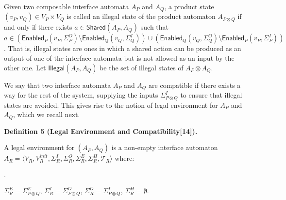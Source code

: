\documentclass[10pt,a4paper]{article}
\begin{document}
 
 
Given two composable interface automata $A_{P}$ and $A_{Q}$, a product state $(v_{P},v_{Q})\in V_{P}\times V_{Q}$ is called an illegal state of the product automaton $A_{P\otimes Q}$ if and only if there exists $a\in\mathsf{Shared}(A_{P},A_{Q})$ such that $a\in(\mathsf{Enabled}_{P}(v_{P},\Sigma_{P}^{O})\setminus\mathsf{Enabled}_{Q}(v_{Q},\Sigma_{Q}^{I}))\cup(\mathsf{Enabled}_{Q}(v_{Q},\Sigma_{Q}^{O})\setminus\mathsf{Enabled}_{P}(v_{P},\Sigma_{P}^{I}))$. That is, illegal states are ones in which a shared action can be produced as an output of one of the interface automata but is not allowed as an input by the other one. Let $\mathsf{Illegal}(A_{P},A_{Q})$ be the set of illegal states of $A_{P}\otimes A_{Q}$.\par
 
 
 
We say that two interface automata $A_{P}$ and $A_{Q}$ are compatible if there exists a way for the rest of the system, supplying the inputs $\Sigma_{P\otimes Q}^{I}$ to ensure that illegal states are avoided. This gives rise to the notion of legal environment for $A_{P}$ and $A_{Q}$, which we recall next.\par
 
 
 
\par\medskip\noindent\textbf{Definition 5 (Legal Environment and Compatibility[14]).}\par
 
 
A legal environment for $(A_{P},A_{Q})$ is a non-empty interface automaton $A_{R}=\langle V_{R},V_{R}^{init},\Sigma_{R}^{I},\Sigma_{R}^{O},\Sigma_{R}^{E},\Sigma_{R}^{H},\mathcal{T}_{R}\rangle$ where:\par
 
 
  
\par{}. 
 
$\Sigma_{R}^{E}=\Sigma_{P\otimes Q}^{E}$, $\Sigma_{R}^{I}=\Sigma_{P\otimes Q}^{O}$, $\Sigma_{R}^{O}=\Sigma_{P\otimes Q}^{I}$, $\Sigma_{R}^{H}=\emptyset$.\par
 
\end{document}
